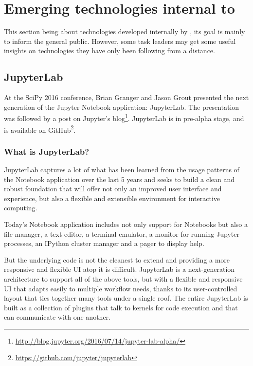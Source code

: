 \documentclass{deliverablereport}
\begin{document}
\section{Emerging technologies internal to \ODK}
\label{sec:internal}

This section being about technologies developed internally by \ODK,
its goal is mainly to inform the general public. However, some task
leaders may get some useful insights on technologies they have only
been following from a distance.

\subsection{JupyterLab}
\label{sec:jupyterlab}

At the SciPy 2016 conference, Brian Granger and Jason Grout presented
the next generation of the Jupyter Notebook application: JupyterLab.
The presentation was followed by a post on Jupyter's
blog\footnote{\url{http://blog.jupyter.org/2016/07/14/jupyter-lab-alpha/}}.
JupyterLab is in pre-alpha stage, and is available on
GitHub\footnote{\url{https://github.com/jupyter/jupyterlab}}.

\subsubsection{What is JupyterLab?}

JupyterLab captures a lot of what has been learned from the usage
patterns of the Notebook application over the last 5 years and seeks
to build a clean and robust foundation that will offer not only an
improved user interface and experience, but also a flexible and
extensible environment for interactive computing.

Today's Notebook application includes not only support for Notebooks
but also a file manager, a text editor, a terminal emulator, a monitor
for running Jupyter processes, an IPython cluster manager and a pager
to display help.  

But the underlying code is not the cleanest to extend and providing a
more responsive and flexible UI atop it is difficult. JupyterLab is a
next-generation architecture to support all of the above tools, but
with a flexible and responsive UI that adapts easily to multiple
workflow needs, thanks to its user-controlled layout that ties
together many tools under a single roof.  The entire JupyterLab is
built as a collection of plugins that talk to kernels for code
execution and that can communicate with one another.
\end{document}
